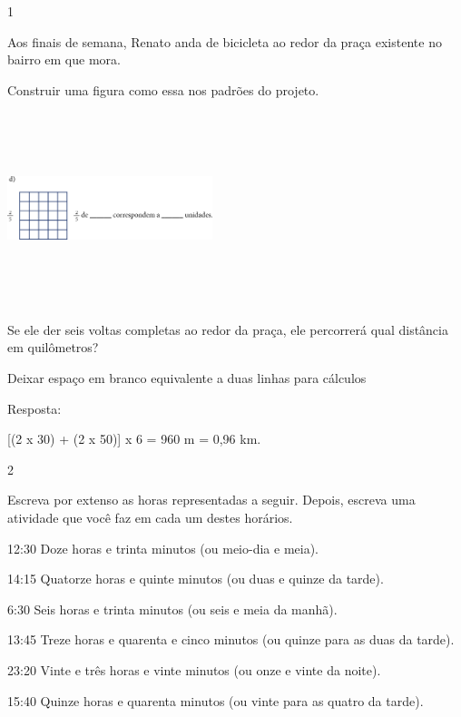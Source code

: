 \begin{mdframed}[linewidth=2pt,linecolor=salmao,roundcorner=2pt]
\begin{itemize}
{\begin{itemize}
\begin{escolha}
{

\num{1}

Aos finais de semana, Renato anda de bicicleta ao redor da praça
existente no bairro em que mora.

Construir uma figura como essa nos padrões do projeto.

\includegraphics[width=2.35256in,height=2.20730in]{media/image61.png}

Se ele der seis voltas completas ao redor da praça, ele percorrerá qual
distância em quilômetros?

Deixar espaço em branco equivalente a duas linhas para cálculos

Resposta:

[(2 x 30) + (2 x 50)] x 6 = 960 m = 0,96 km.


\num{2}

Escreva por extenso as horas representadas a seguir. Depois, escreva uma atividade que você faz em cada um destes horários.

\begin{escolha}
  \item 12:30
  Doze horas e trinta minutos (ou meio-dia e meia).
  \item 14:15
  Quatorze horas e quinte minutos (ou duas e quinze da tarde).
  \item 6:30
  Seis horas e trinta minutos (ou seis e meia da manhã).
  \item 13:45
  Treze horas e quarenta e cinco minutos (ou quinze para as duas da tarde).
  \item 23:20
  Vinte e três horas e vinte minutos (ou onze e vinte da noite).
  \item 15:40
  Quinze horas e quarenta minutos (ou vinte para as quatro da tarde).
\end{escolha}

}
\end{escolha}
\end{itemize}}
\end{itemize}
\end{mdframed}
